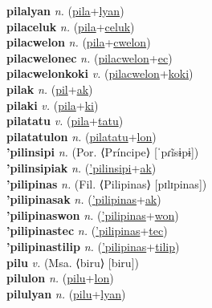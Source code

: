\textbf{pilalyan} \textit{n.} (\hyperref[pila]{pila}+\hyperref[lyan]{lyan})
 \label{pilalyan} \\
\textbf{pilaceluk} \textit{n.} (\hyperref[pila]{pila}+\hyperref[celuk]{celuk})
 \label{pilaceluk} \\
\textbf{pilacwelon} \textit{n.} (\hyperref[pila]{pila}+\hyperref[cwelon]{cwelon})
 \label{pilacwelon} \\
\textbf{pilacwelonec} \textit{n.} (\hyperref[pilacwelon]{pilacwelon}+\hyperref[ec]{ec})
 \label{pilacwelonec} \\
\textbf{pilacwelonkoki} \textit{v.} (\hyperref[pilacwelon]{pilacwelon}+\hyperref[koki]{koki})
 \label{pilacwelonkoki} \\
\textbf{pilak} \textit{n.} (\hyperref[pil]{pil}+\hyperref[ak]{ak})
 \label{pilak} \\
\textbf{pilaki} \textit{v.} (\hyperref[pila]{pila}+\hyperref[ki]{ki})
 \label{pilaki} \\
\textbf{pilatatu} \textit{v.} (\hyperref[pila]{pila}+\hyperref[tatu]{tatu})
 \label{pilatatu} \\
\textbf{pilatatulon} \textit{n.} (\hyperref[pilatatu]{pilatatu}+\hyperref[lon]{lon})
 \label{pilatatulon} \\
\textbf{'pilinsipi} \textit{n.} (Por. ⟨Príncipe⟩ [ˈpɾĩsɨpɨ])
 \label{'pilinsipi} \\
\textbf{'pilinsipiak} \textit{n.} (\hyperref['pilinsipi]{'pilinsipi}+\hyperref[ak]{ak})
 \label{'pilinsipiak} \\
\textbf{'pilipinas} \textit{n.} (Fil. ⟨Pilipinas⟩ [pɪlɪpinas])
 \label{'pilipinas} \\
\textbf{'pilipinasak} \textit{n.} (\hyperref['pilipinas]{'pilipinas}+\hyperref[ak]{ak})
 \label{'pilipinasak} \\
\textbf{'pilipinaswon} \textit{n.} (\hyperref['pilipinas]{'pilipinas}+\hyperref[won]{won})
 \label{'pilipinaswon} \\
\textbf{'pilipinastec} \textit{n.} (\hyperref['pilipinas]{'pilipinas}+\hyperref[tec]{tec})
 \label{'pilipinastec} \\
\textbf{'pilipinastilip} \textit{n.} (\hyperref['pilipinas]{'pilipinas}+\hyperref[tilip]{tilip})
 \label{'pilipinastilip} \\
\textbf{pilu} \textit{v.} (Msa. ⟨biru⟩ [biru])
 \label{pilu} \\
\textbf{pilulon} \textit{n.} (\hyperref[pilu]{pilu}+\hyperref[lon]{lon})
 \label{pilulon} \\
\textbf{pilulyan} \textit{n.} (\hyperref[pilu]{pilu}+\hyperref[lyan]{lyan})
